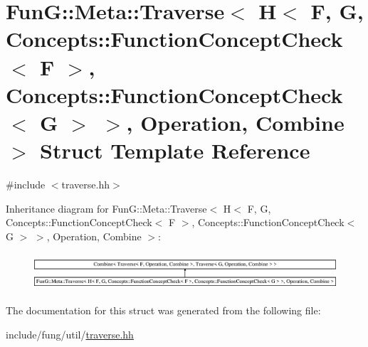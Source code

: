 \hypertarget{structFunG_1_1Meta_1_1Traverse_3_01H_3_01F_00_01G_00_01Concepts_1_1FunctionConceptCheck_3_01F_013370ce68fd07becd92320937a020c699}{}\section{FunG\+:\+:Meta\+:\+:Traverse$<$ H$<$ F, G, Concepts\+:\+:Function\+Concept\+Check$<$ F $>$, Concepts\+:\+:Function\+Concept\+Check$<$ G $>$ $>$, Operation, Combine $>$ Struct Template Reference}
\label{structFunG_1_1Meta_1_1Traverse_3_01H_3_01F_00_01G_00_01Concepts_1_1FunctionConceptCheck_3_01F_013370ce68fd07becd92320937a020c699}


{\ttfamily \#include $<$traverse.\+hh$>$}

Inheritance diagram for FunG\+:\+:Meta\+:\+:Traverse$<$ H$<$ F, G, Concepts\+:\+:Function\+Concept\+Check$<$ F $>$, Concepts\+:\+:Function\+Concept\+Check$<$ G $>$ $>$, Operation, Combine $>$\+:\begin{figure}[H]
\begin{center}
\leavevmode
\includegraphics[height=1.377614cm]{structFunG_1_1Meta_1_1Traverse_3_01H_3_01F_00_01G_00_01Concepts_1_1FunctionConceptCheck_3_01F_013370ce68fd07becd92320937a020c699}
\end{center}
\end{figure}


The documentation for this struct was generated from the following file\+:\begin{DoxyCompactItemize}
\item 
include/fung/util/\hyperlink{traverse_8hh}{traverse.\+hh}\end{DoxyCompactItemize}
